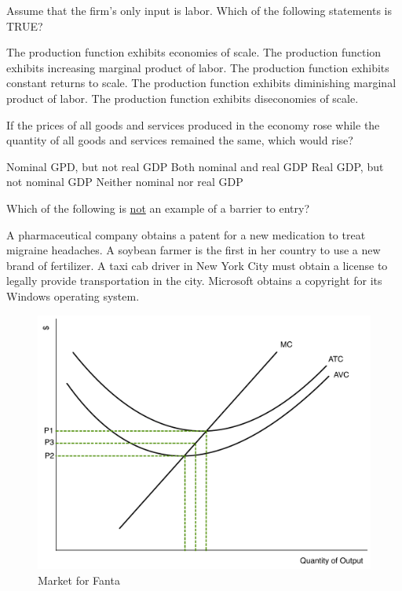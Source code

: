 \documentclass[addpoints,11pt]{exam}
\theoremstyle{definition}
\begin{document}
\begin{questions}
	Assume that the firm's only input is labor. Which of the following statements is TRUE?
	
	\begin{choices}
		\choice The production function exhibits economies of scale.
		\choice The production function exhibits increasing marginal product of labor.
		\choice The production function exhibits constant returns to scale.
		\CorrectChoice The production function exhibits diminishing marginal product of labor.
		\choice The production function exhibits diseconomies of scale.
	\end{choices}

\question If the prices of all goods and services produced in the economy rose while the quantity of all goods and services remained the same, which would rise?

\begin{choices}
	\CorrectChoice Nominal GPD, but not real GDP
	\choice Both nominal and real GDP
	\choice Real GDP, but not nominal GDP
	\choice Neither nominal nor real GDP
\end{choices}

\question Which of the following is \underline{not} an example of a barrier to entry?

\begin{choices}
	\choice A pharmaceutical company obtains a patent for a new medication to treat migraine headaches.
	\CorrectChoice A soybean farmer is the first in her country to use a new brand of fertilizer.
	\choice A taxi cab driver in New York City must obtain a license to legally provide transportation in the city.
	\choice Microsoft obtains a copyright for its Windows operating system.
\end{choices}
	

	
	\begin{figure}[H]
		\centering
		\includegraphics[scale=.40]{Exam1_MC27.pdf}
		\caption{Market for Fanta}
		\label{MC28}
	\end{figure}



\end{questions}
\end{document}
